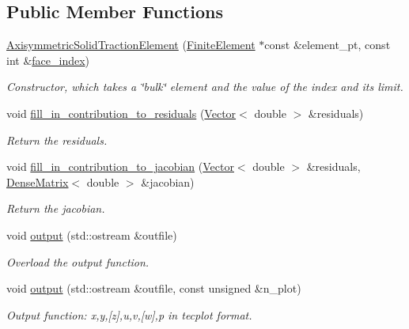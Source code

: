 \subsection*{Public Member Functions}
\begin{DoxyCompactItemize}
\item 
\hyperlink{classoomph_1_1AxisymmetricSolidTractionElement_add2978a434bca4d36ca2dc5ec0107ff9}{Axisymmetric\+Solid\+Traction\+Element} (\hyperlink{classoomph_1_1FiniteElement}{Finite\+Element} $\ast$const \&element\+\_\+pt, const int \&\hyperlink{classoomph_1_1FaceElement_a478d577ac6db67ecc80f1f02ae3ab170}{face\+\_\+index})
\begin{DoxyCompactList}\small\item\em Constructor, which takes a \char`\"{}bulk\char`\"{} element and the value of the index and its limit. \end{DoxyCompactList}\item 
void \hyperlink{classoomph_1_1AxisymmetricSolidTractionElement_a4cd8a5664e8a62263e376dd9eb9ea985}{fill\+\_\+in\+\_\+contribution\+\_\+to\+\_\+residuals} (\hyperlink{classoomph_1_1Vector}{Vector}$<$ double $>$ \&residuals)
\begin{DoxyCompactList}\small\item\em Return the residuals. \end{DoxyCompactList}\item 
void \hyperlink{classoomph_1_1AxisymmetricSolidTractionElement_a49de689d7dc2efecd8bbdbd6673c1fb8}{fill\+\_\+in\+\_\+contribution\+\_\+to\+\_\+jacobian} (\hyperlink{classoomph_1_1Vector}{Vector}$<$ double $>$ \&residuals, \hyperlink{classoomph_1_1DenseMatrix}{Dense\+Matrix}$<$ double $>$ \&jacobian)
\begin{DoxyCompactList}\small\item\em Return the jacobian. \end{DoxyCompactList}\item 
void \hyperlink{classoomph_1_1AxisymmetricSolidTractionElement_a26333e5b7fd2aabb61d21f3289797b27}{output} (std\+::ostream \&outfile)
\begin{DoxyCompactList}\small\item\em Overload the output function. \end{DoxyCompactList}\item 
void \hyperlink{classoomph_1_1AxisymmetricSolidTractionElement_a018d7c00d4eacabec5f9c30968b6bab7}{output} (std\+::ostream \&outfile, const unsigned \&n\+\_\+plot)
\begin{DoxyCompactList}\small\item\em Output function\+: x,y,\mbox{[}z\mbox{]},u,v,\mbox{[}w\mbox{]},p in tecplot format. \end{DoxyCompactList}\item 

\end{DoxyCompactItemize}

